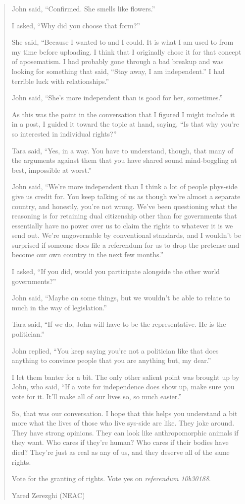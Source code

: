 \begin{quote}
John said, ``Confirmed. She smells like flowers.''

I asked, ``Why did you choose that form?''

She said, ``Because I wanted to and I could. It is what I am used to from my time before uploading. I think that I originally chose it for that concept of aposematism. I had probably gone through a bad breakup and was looking for something that said, ``Stay away, I am independent.'' I had terrible luck with relationships.''

John said, ``She's more independent than is good for her, sometimes.''

As this was the point in the conversation that I figured I might include it in a post, I guided it toward the topic at hand, saying, ``Is that why you're so interested in individual rights?''

Tara said, ``Yes, in a way. You have to understand, though, that many of the arguments against them that you have shared sound mind-boggling at best, impossible at worst.''

John said, ``We're more independent than I think a lot of people phys-side give us credit for. You keep talking of us as though we're almost a separate country, and honestly, you're not wrong. We've been questioning what the reasoning is for retaining dual citizenship other than for governments that essentially have no power over us to claim the rights to whatever it is we send out. We're ungovernable by conventional standards, and I wouldn't be surprised if someone does file a referendum for us to drop the pretense and become our own country in the next few months.''

I asked, ``If you did, would you participate alongside the other world governments?''

John said, ``Maybe on some things, but we wouldn't be able to relate to much in the way of legislation.''

Tara said, ``If we do, John will have to be the representative. He is the politician.''

John replied, ``You keep saying you're not a politician like that does anything to convince people that you are anything but, my dear.''

I let them banter for a bit. The only other salient point was brought up by John, who said, ``If a vote for independence does show up, make sure you vote for it. It'll make all of our lives so, so much easier.''

So, that was our conversation. I hope that this helps you understand a bit more what the lives of those who live sys-side are like. They joke around. They have strong opinions. They can look like anthropomorphic animals if they want. Who cares if they're human? Who cares if their bodies have died? They're just as real as any of us, and they deserve all of the same rights.

Vote for the granting of rights. Vote yes on \emph{referendum 10b30188}.

Yared Zerezghi (NEAC)
\end{quote}

